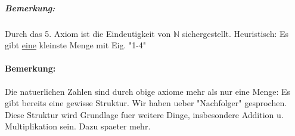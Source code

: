 \subparagraph{Bemerkung:}
Durch das 5. Axiom ist die Eindeutigkeit von $\mathbb{N}$ sichergestellt. Heuristisch: Es gibt \underline{eine} kleinste Menge mit Eig. "1-4"

\paragraph{Bemerkung:}
Die natuerlichen Zahlen sind durch obige axiome mehr als nur eine Menge: Es gibt bereits eine gewisse Struktur. Wir haben ueber "Nachfolger" gesprochen. Diese Struktur wird Grundlage fuer weitere Dinge, insbesondere Addition u. Multiplikation sein. Dazu spaeter mehr.

